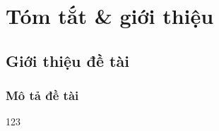 \chapter{Tóm tắt \& giới thiệu}
\minitoc
\newpage
\section{Giới thiệu đề tài}
\subsection{Mô tả đề tài}
123
